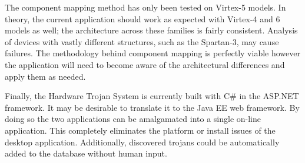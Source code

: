 The component mapping method has only been tested on Virtex-5 models. 
In theory, the current application should work as expected with Virtex-4 and 6 models as well; the architecture across these families is fairly consistent. 
Analysis of devices with vastly different structures, such as the Spartan-3, may cause failures.
The methodology behind component mapping is perfectly viable however the application will need to become aware of the architectural differences and apply them as needed.

Finally, the Hardware Trojan System is currently built with C\# in the ASP.NET framework.
It may be desirable to translate it to the Java EE web framework.
By doing so the two applications can be amalgamated into a single on-line application.
This completely eliminates the platform or install issues of the desktop application.
Additionally, discovered trojans could be automatically added to the database without human input. 

